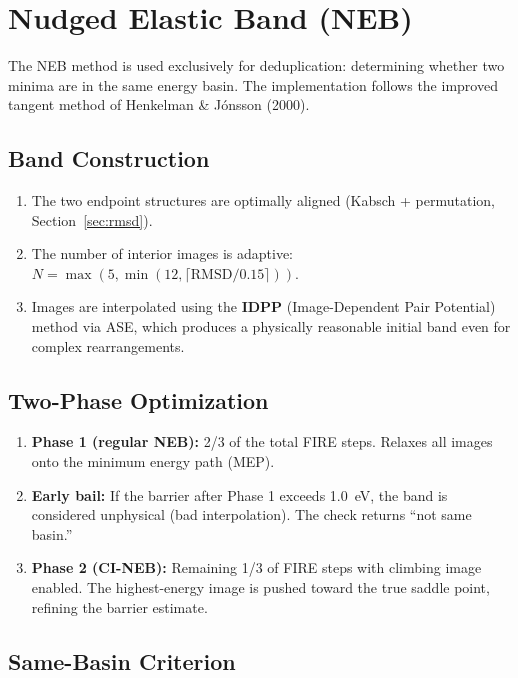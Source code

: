 \documentclass[11pt,a4paper]{article}
\begin{document}
\section{Nudged Elastic Band (NEB)}
\label{sec:neb}

The NEB method is used exclusively for deduplication: determining whether two minima are in the same energy basin. The implementation follows the improved tangent method of Henkelman \& J\'{o}nsson (2000).

\subsection{Band Construction}

\begin{enumerate}
    \item The two endpoint structures are optimally aligned (Kabsch + permutation, Section~\ref{sec:rmsd}).
    \item The number of interior images is adaptive: $N = \max(5, \min(12, \lceil \text{RMSD}/0.15 \rceil))$.
    \item Images are interpolated using the \textbf{IDPP} (Image-Dependent Pair Potential) method via ASE, which produces a physically reasonable initial band even for complex rearrangements.
\end{enumerate}

\subsection{Two-Phase Optimization}

\begin{enumerate}
    \item \textbf{Phase 1 (regular NEB):} 2/3 of the total FIRE steps. Relaxes all images onto the minimum energy path (MEP).
    \item \textbf{Early bail:} If the barrier after Phase 1 exceeds \SI{1.0}{eV}, the band is considered unphysical (bad interpolation). The check returns ``not same basin.''
    \item \textbf{Phase 2 (CI-NEB):} Remaining 1/3 of FIRE steps with climbing image enabled. The highest-energy image is pushed toward the true saddle point, refining the barrier estimate.
\end{enumerate}

\subsection{Same-Basin Criterion}
\end{document}
